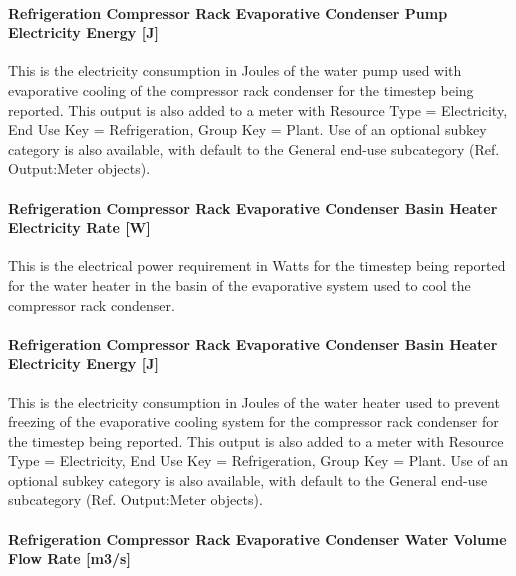 \paragraph{Refrigeration Compressor Rack Evaporative Condenser Pump Electricity Energy {[}J{]}}\label{refrigeration-compressor-rack-evaporative-condenser-pump-electric-energy-j}

This is the electricity consumption in Joules of the water pump used with evaporative cooling of the compressor rack condenser for the timestep being reported. This output is also added to a meter with Resource Type = Electricity, End Use Key = Refrigeration, Group Key = Plant. Use of an optional subkey category is also available, with default to the General end-use subcategory (Ref. Output:Meter objects).

\paragraph{Refrigeration Compressor Rack Evaporative Condenser Basin Heater Electricity Rate {[}W{]}}\label{refrigeration-compressor-rack-evaporative-condenser-basin-heater-electric-power-w}

This is the electrical power requirement in Watts for the timestep being reported for the water heater in the basin of the evaporative system used to cool the compressor rack condenser.

\paragraph{Refrigeration Compressor Rack Evaporative Condenser Basin Heater Electricity Energy {[}J{]}}\label{refrigeration-compressor-rack-evaporative-condenser-basin-heater-electric-energy-j}

This is the electricity consumption in Joules of the water heater used to prevent freezing of the evaporative cooling system for the compressor rack condenser for the timestep being reported. This output is also added to a meter with Resource Type = Electricity, End Use Key = Refrigeration, Group Key = Plant. Use of an optional subkey category is also available, with default to the General end-use subcategory (Ref. Output:Meter objects).

\paragraph{Refrigeration Compressor Rack Evaporative Condenser Water Volume Flow Rate {[}m3/s{]}}\label{refrigeration-compressor-rack-evaporative-condenser-water-volume-flow-rate-m3s}


